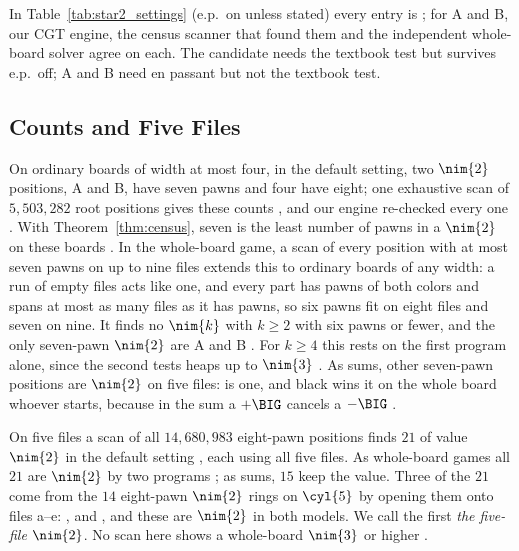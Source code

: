 In Table~\ref{tab:star2_settings} (e.p.\ on unless stated) every entry is ; for A and B, our CGT
engine, the census scanner that found them and the independent whole-board solver agree on each. The candidate
needs the textbook test but survives e.p.\ off; A and B need en passant but not the textbook test.

\subsection{Counts and Five Files}\label{sec:star2-five}

On ordinary boards of width at most four, in the default setting, two $\nim{2}$ positions, A and B, have seven pawns
and four have eight; one exhaustive scan of $5{,}503{,}282$ root positions gives these counts , and our
engine re-checked every one . With
Theorem~\ref{thm:census}, seven is the least number of pawns in a $\nim{2}$ on these boards . In the
whole-board game, a scan of every position with at most seven pawns on up to nine files extends this to ordinary
boards of any width: a run of empty files acts like one, and every part has pawns of both colors and spans at most
as many files as it has pawns, so six pawns fit on eight files and seven on nine. It finds no $\nim{k}$ with $k\ge2$ with six pawns or fewer, and the only seven-pawn $\nim{2}$ are A and
B . For $k\ge4$ this rests on the first program alone, since the second tests heaps up to $\nim{3}$ . As sums, other seven-pawn positions are $\nim{2}$ on five files:  is one, and black wins it on the whole board whoever starts, because in the sum a $+\BIG$ cancels a $-\BIG$ .

On five files a scan of all $14{,}680{,}983$ eight-pawn positions finds $21$ of value $\nim{2}$ in the default
setting , each using all five files. As whole-board games all $21$ are $\nim{2}$ by two programs ;
as sums, $15$ keep the value. Three of the
$21$ come from the $14$ eight-pawn $\nim{2}$ rings on $\cyl{5}$  by opening them onto files a--e:
,  and
,
and these are $\nim{2}$ in both models. We call the first \emph{the five-file $\nim{2}$}. No scan here shows a whole-board $\nim{3}$ or higher
.


